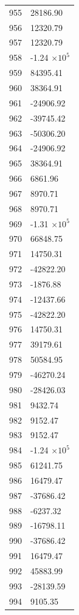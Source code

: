\documentclass[a4paper,11pt]{article}
\begin{document}
\begin{center}
\begin{longtable}{|R{1.5cm}|R{2.5cm}|}
  955 &     28186.90 \\
  956 &     12320.79 \\
  957 &     12320.79 \\
  958 &        -1.24 $\times 10^{           5}$ \\
  959 &     84395.41 \\
  960 &     38364.91 \\
  961 &    -24906.92 \\
  962 &    -39745.42 \\
  963 &    -50306.20 \\
  964 &    -24906.92 \\
  965 &     38364.91 \\
  966 &      6861.96 \\
  967 &      8970.71 \\
  968 &      8970.71 \\
  969 &        -1.31 $\times 10^{           5}$ \\
  970 &     66848.75 \\
  971 &     14750.31 \\
  972 &    -42822.20 \\
  973 &     -1876.88 \\
  974 &    -12437.66 \\
  975 &    -42822.20 \\
  976 &     14750.31 \\
  977 &     39179.61 \\
  978 &     50584.95 \\
  979 &    -46270.24 \\
  980 &    -28426.03 \\
  981 &      9432.74 \\
  982 &      9152.47 \\
  983 &      9152.47 \\
  984 &        -1.24 $\times 10^{           5}$ \\
  985 &     61241.75 \\
  986 &     16479.47 \\
  987 &    -37686.42 \\
  988 &     -6237.32 \\
  989 &    -16798.11 \\
  990 &    -37686.42 \\
  991 &     16479.47 \\
  992 &     45883.99 \\
  993 &    -28139.59 \\
  994 &      9105.35 \\

\end{longtable}
\end{center}
\end{document}
